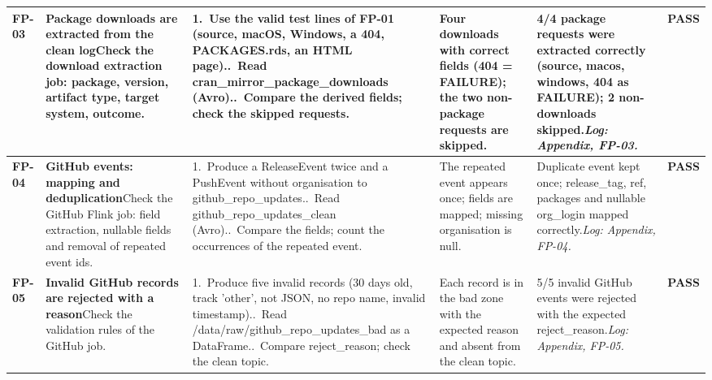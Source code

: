{\begin{longtable}{@{}L{1.1cm}L{5.8cm}L{5.4cm}L{3.9cm}L{5.5cm}L{1.3cm}@{}}
\textbf{FP-03} & \textbf{Package downloads are extracted from the clean log}\newline Check the download extraction job: package, version, artifact type, target system, outcome. & 1.~Use the valid test lines of FP-01 (source, macOS, Windows, a 404, PACKAGES.rds, an HTML page)..~Read cran\_\allowbreak{}mirror\_\allowbreak{}package\_\allowbreak{}downloads (Avro)..~Compare the derived fields; check the skipped requests. & Four downloads with correct fields (404 = FAILURE); the two non-package requests are skipped. & 4/\allowbreak{}4 package requests were extracted correctly (source, macos, windows, 404 as FAILURE); 2 non-downloads skipped.\newline \textit{Log: Appendix, FP-03.} & \textbf{\textcolor{green!45!black}{PASS}} \\
\midrule[0.3pt]
\textbf{FP-04} & \textbf{GitHub events: mapping and deduplication}\newline Check the GitHub Flink job: field extraction, nullable fields and removal of repeated event ids. & 1.~Produce a ReleaseEvent twice and a PushEvent without organisation to github\_\allowbreak{}repo\_\allowbreak{}updates..~Read github\_\allowbreak{}repo\_\allowbreak{}updates\_\allowbreak{}clean (Avro)..~Compare the fields; count the occurrences of the repeated event. & The repeated event appears once; fields are mapped; missing organisation is null. & Duplicate event kept once; release\_\allowbreak{}tag, ref, packages and nullable org\_\allowbreak{}login mapped correctly.\newline \textit{Log: Appendix, FP-04.} & \textbf{\textcolor{green!45!black}{PASS}} \\
\midrule[0.3pt]
\textbf{FP-05} & \textbf{Invalid GitHub records are rejected with a reason}\newline Check the validation rules of the GitHub job. & 1.~Produce five invalid records (30 days old, track 'other', not JSON, no repo name, invalid timestamp)..~Read /\allowbreak{}data/\allowbreak{}raw/\allowbreak{}github\_\allowbreak{}repo\_\allowbreak{}updates\_\allowbreak{}bad as a DataFrame..~Compare reject\_\allowbreak{}reason; check the clean topic. & Each record is in the bad zone with the expected reason and absent from the clean topic. & 5/\allowbreak{}5 invalid GitHub events were rejected with the expected reject\_\allowbreak{}reason.\newline \textit{Log: Appendix, FP-05.} & \textbf{\textcolor{green!45!black}{PASS}} \\

\end{longtable}}
